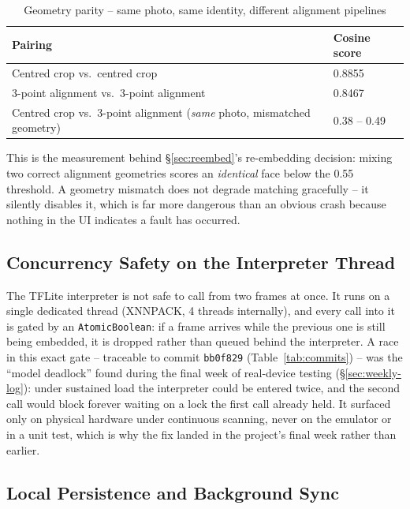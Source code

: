 \documentclass[12pt,a4paper,oneside]{report}
\newcommand{\code}[1]{\texttt{#1}}
\begin{document}
\begin{table}[H]
\centering
\caption{Geometry parity -- same photo, same identity, different alignment pipelines}
\begin{tabular}{|p{7.0cm}|p{3.8cm}|}
\hline
\textbf{Pairing} & \textbf{Cosine score} \\
\hline
Centred crop vs.\ centred crop & 0.8855 \\ \hline
3-point alignment vs.\ 3-point alignment & 0.8467 \\ \hline
Centred crop vs.\ 3-point alignment (\emph{same} photo, mismatched geometry) & 0.38 -- 0.49 \\
\hline
\end{tabular}
\end{table}

This is the measurement behind \S\ref{sec:reembed}'s re-embedding decision: mixing two
correct alignment geometries scores an \emph{identical} face below the 0.55
threshold. A geometry mismatch does not degrade matching gracefully -- it
silently disables it, which is far more dangerous than an obvious crash
because nothing in the UI indicates a fault has occurred.

\subsection{Concurrency Safety on the Interpreter Thread}
\label{sec:concurrency-safety}

The TFLite interpreter is not safe to call from two frames at once. It runs
on a single dedicated thread (XNNPACK, 4 threads internally), and every
call into it is gated by an \code{AtomicBoolean}: if a frame arrives while
the previous one is still being embedded, it is dropped rather than queued
behind the interpreter. A race in this exact gate -- traceable to commit
\texttt{bb0f829} (Table~\ref{tab:commits}) -- was the ``model deadlock''
found during the final week of real-device testing (\S\ref{sec:weekly-log}): under
sustained load the interpreter could be entered twice, and the second call
would block forever waiting on a lock the first call already held. It
surfaced only on physical hardware under continuous scanning, never on the
emulator or in a unit test, which is why the fix landed in the project's
final week rather than earlier.

\subsection{Local Persistence and Background Sync}
\end{document}
